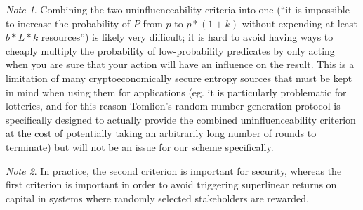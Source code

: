 \documentclass[11pt,a4paper]{article}
\theoremstyle{plain}
\theoremstyle{definition}
\theoremstyle{remark}
\newtheorem*{note}{Note}
\begin{document}
\begin{note}
Combining the two uninfluenceability criteria into one (``it is impossible to increase the probability of $P$ from $p$ to $p * (1 + k)$ without expending at least $b * L * k$ resources'') is likely very difficult; it is hard to avoid having ways to cheaply multiply the probability of low-probability predicates by only acting when you are sure that your action will have an influence on the result. This is a limitation of many cryptoeconomically secure entropy sources that must be kept in mind when using them for applications (eg. it is particularly problematic for lotteries, and for this reason Tomlion's random-number generation protocol\cite{tomlion} is specifically designed to actually provide the combined uninfluenceability criterion at the cost of potentially taking an arbitrarily long number of rounds to terminate) but will not be an issue for our scheme specifically.
\end{note}

\begin{note}
In practice, the second criterion is important for security, whereas the first criterion is important in order to avoid triggering superlinear returns on capital in systems where randomly selected stakeholders are rewarded.
\end{note}
\end{document}
